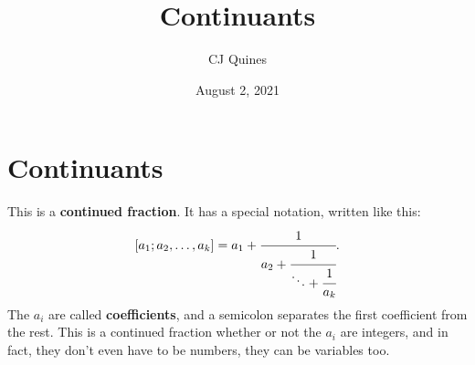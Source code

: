 \documentclass[11pt,paper=letter]{scrartcl}
\begin{document}
\title{Continuants}
\author{CJ Quines}
\date{August 2, 2021}

\maketitle

\section{Continuants}

This is a \textbf{continued fraction}. It has a special notation, written like this:  \[
  [a_1; a_2, \ldots, a_k] =
  a_1 + \cfrac{1}{
    a_2 + \cfrac{1}{
      \ddots + \cfrac{1}{a_k}
    }
  }.
\]
The $a_i$ are called \textbf{coefficients}, and a semicolon separates the first coefficient from the rest. This is a continued fraction whether or not the $a_i$ are integers, and in fact, they don't even have to be numbers, they can be variables too.
\end{document}
